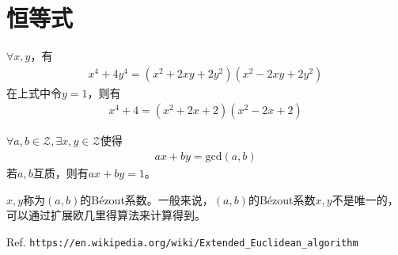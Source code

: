 
\chapter{恒等式}
\label{chap:identities}

\begin{theorem}
  $\forall x,y$，有
  \begin{align*}
    x^4 + 4y^4 = (x^2 + 2xy + 2y^2)(x^2 - 2xy + 2y^2)
  \end{align*}
  在上式中令$y=1$，则有
  \begin{align*}
    x^4 + 4 = (x^2 + 2x + 2)(x^2 - 2x + 2)
  \end{align*}
\end{theorem}

\begin{theorem}\label{th:Bezout}
  $\forall a,b\in\mathcal{Z},\exists x,y\in\mathcal{Z}$使得
  \begin{align*}
    ax+by=\mathrm{gcd}(a,b)
  \end{align*}
  若$a,b$互质，则有$ax+by=1$。
\end{theorem}

$x,y$称为$(a,b)$的B\'ezout系数。一般来说，$(a,b)$的B\'ezout系数$x,y$不是唯一的，可以通过扩展欧几里得算法来计算得到。

\begin{definition}[扩展欧几里得算法]
  Ref. \verb|https://en.wikipedia.org/wiki/Extended_Euclidean_algorithm|
\end{definition}

